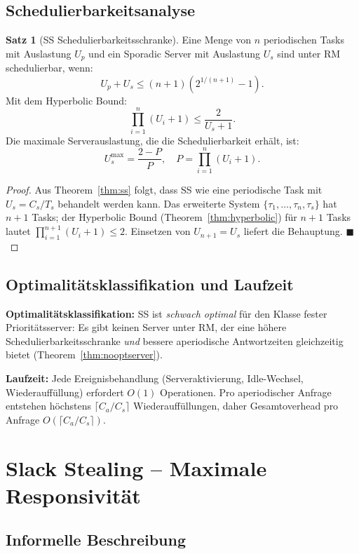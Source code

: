﻿\documentclass[a4paper,12pt]{report}
\theoremstyle{definition}
\newtheorem{satz}{Satz}[chapter]
\begin{document}
\subsection{Schedulierbarkeitsanalyse}

\begin{satz}[SS Schedulierbarkeitsschranke]
	\label{satz:ss_sched}
	Eine Menge von $n$ periodischen Tasks mit Auslastung $U_p$ und ein
	Sporadic Server mit Auslastung $U_s$ sind unter RM schedulierbar, wenn:
	\[
		U_p + U_s \leq (n+1)\left(2^{1/(n+1)} - 1\right).
	\]
	Mit dem Hyperbolic Bound:
	\[
		\prod_{i=1}^n (U_i + 1) \leq \frac{2}{U_s + 1}.
	\]
	Die maximale Serverauslastung, die die Schedulierbarkeit erhält, ist:
	\[
		U_s^{\max} = \frac{2-P}{P}, \quad P = \prod_{i=1}^n (U_i + 1).
	\]
\end{satz}

\begin{proof}
	Aus Theorem~\ref{thm:ss} folgt, dass SS wie eine periodische Task mit
	$U_s = C_s/T_s$ behandelt werden kann. Das erweiterte System
	$\{\tau_1,\ldots,\tau_n, \tau_s\}$ hat $n+1$ Tasks; der Hyperbolic Bound
	(Theorem~\ref{thm:hyperbolic}) für $n+1$ Tasks lautet $\prod_{i=1}^{n+1}(U_i+1) \leq 2$.
	Einsetzen von $U_{n+1} = U_s$ liefert die Behauptung. \hfill$\blacksquare$
\end{proof}

\subsection{Optimalitätsklassifikation und Laufzeit}

\textbf{Optimalitätsklassifikation:} SS ist \emph{schwach optimal} für den
Klasse fester Prioritätsserver: Es gibt keinen Server unter RM, der eine
höhere Schedulierbarkeitsschranke \emph{und} bessere aperiodische Antwortzeiten
gleichzeitig bietet (Theorem~\ref{thm:nooptserver}).

\textbf{Laufzeit:} Jede Ereignisbehandlung (Serveraktivierung, Idle-Wechsel,
Wiederauffüllung) erfordert $O(1)$ Operationen. Pro aperiodischer Anfrage
entstehen höchstens $\lceil C_a/C_s \rceil$ Wiederauffüllungen, daher
Gesamtoverhead pro Anfrage $O(\lceil C_a/C_s \rceil)$.

\section{Slack Stealing -- Maximale Responsivität}

\subsection{Informelle Beschreibung}
\end{document}
